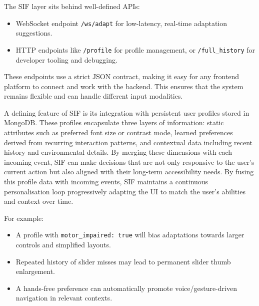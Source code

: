 \documentclass[openany]{book}
\begin{document}
The SIF layer sits behind well-defined APIs:
\begin{itemize}
    \item WebSocket endpoint \texttt{/ws/adapt} for low-latency, real-time adaptation suggestions.
    \item HTTP endpoints like \texttt{/profile} for profile management, or \texttt{/full\_history} for developer tooling and debugging.
\end{itemize}
These endpoints use a strict JSON contract, making it easy for any frontend platform to connect and work with the backend. This ensures that the system remains flexible and can handle different input modalities.

A defining feature of SIF is its integration with persistent user profiles stored in MongoDB. These profiles encapsulate three layers of information: static attributes such as preferred font size or contrast mode, learned preferences derived from recurring interaction patterns, and contextual data including recent history and environmental details. By merging these dimensions with each incoming event, SIF can make decisions that are not only responsive to the user’s current action but also aligned with their long-term accessibility needs.
By fusing this profile data with incoming events, SIF maintains a continuous personalisation loop progressively adapting the UI to match the user’s abilities and context over time.

For example:
\begin{itemize}
    \item A profile with \texttt{motor\_impaired: true} will bias adaptations towards larger controls and simplified layouts.
    \item Repeated history of slider misses may lead to permanent slider thumb enlargement.
    \item A hands-free preference can automatically promote voice/gesture-driven navigation in relevant contexts.
\end{itemize}
\end{document}
